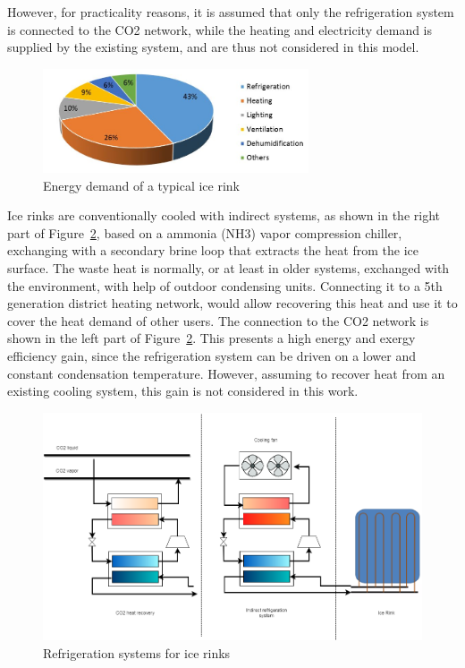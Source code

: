 \documentclass{article}
\begin{document}
However, for practicality reasons, it is assumed that only the refrigeration system is connected to the CO2 network, while the heating and electricity demand is supplied by the existing system, and are thus not considered in this model.

\begin{figure}[htp]
	\centering
	\includegraphics[width=0.7\textwidth]{IR_energyDemand.JPG}
	\caption{Energy demand of a typical ice rink~\cite{kolasniewskiEvaluationModellingIce2017}}
	\label{fig:IR_energyDemand}
\end{figure}

Ice rinks are conventionally cooled with indirect systems, as shown in the right part of Figure~\ref{fig:IR_refSystem}, based on a ammonia (NH3) vapor compression chiller, exchanging with a secondary brine loop that extracts the heat from the ice surface. The waste heat is normally, or at least in older systems, exchanged with the environment, with help of outdoor condensing units. Connecting it to a 5th generation district heating network, would allow recovering this heat and use it to cover the heat demand of other users. The connection to the CO2 network is shown in the left part of Figure~\ref{fig:IR_refSystem}. This presents a high energy and exergy efficiency gain, since the refrigeration system can be driven on a lower and constant condensation temperature. However, assuming to recover heat from an existing cooling system, this gain is not considered in this work.\\

\begin{figure}[htp]
	\centering
	\includegraphics[width=1\textwidth]{IceRink_refrigeration.png}
	\caption{Refrigeration systems for ice rinks}
	\label{fig:IR_refSystem}
\end{figure}
\end{document}
